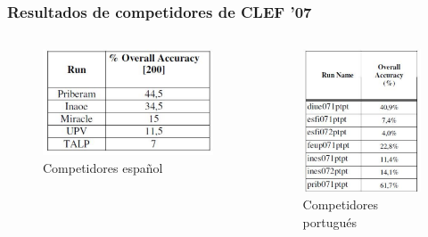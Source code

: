 \begin{frame}
\frametitle{Resultados de competidores de CLEF '07}

\begin{columns}[T] %
\begin{column}{.48\textwidth}
  \begin{figure}
      \includegraphics[scale=0.4]{graficos/resultados-espaniol-resumen}
    \caption{Competidores español}
  \end{figure}
\end{column}%
\hfill%
\begin{column}{.48\textwidth}

  \begin{figure}
      \includegraphics[scale=0.4]{graficos/resultados-portugues}
    \caption{Competidores portugués}
  \end{figure}
\end{column}%
\end{columns}

\end{frame}
